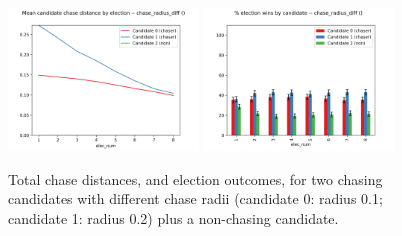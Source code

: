 \begin{figure}
\centering
\includegraphics[width=0.45\textwidth]{assets/diff_chase_radii_dists.png}
\includegraphics[width=0.45\textwidth]{assets/diff_chase_radii_winners.png}
\caption{Total chase distances, and election outcomes, for two chasing
candidates with different chase radii (candidate 0: radius 0.1; candidate 1:
radius 0.2) plus a non-chasing candidate.}
\label{diff_chase_radius}

\end{figure}










